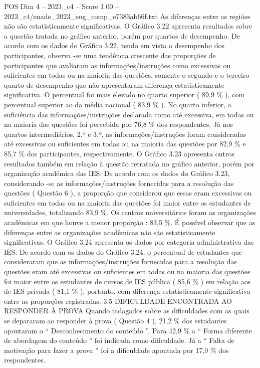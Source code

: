 \begin{textsample}{POS Dim 4 – 2023\_c4 – Score 1.00 – 2023\_c4/enade\_2023\_eng\_comp\_e7383ab66f.txt}
As diferenças entre as regiões não são estatisticamente significativas.
O Gráfico 3.22 apresenta resultados sobre a questão tratada no gráfico anterior, porém por quartos de desempenho.
De acordo com os dados do Gráfico 3.22, tendo em vista o desempenho dos participantes, observa -se uma tendência crescente das proporções de participantes que avaliaram as informações/instruções como excessivas ou suficientes em todas ou na maioria das questões, somente o segundo e o terceiro quarto de desempenho que não apresentaram diferença estatisticamente significativa.
O percentual foi mais elevado no quarto superior ( 89,9 \% ), com percentual superior ao da média nacional ( 83,9 \% ).
No quarto inferior, a suficiência das informações/instruções declarada como até excessiva, em todas ou na maioria das questões foi percebida por 76,8 \% dos respondentes.
Já nos quartos intermediários, 2.º e 3.º, as informações/instruções foram consideradas até excessivas ou suficientes em todas ou na maioria das questões por 82,9 \% e 85,7 \% dos participantes, respectivamente.
O Gráfico 3.23 apresenta outros resultados também em relação à questão retratada no gráfico anterior, porém por organização acadêmica das IES.
De acordo com os dados do Gráfico 3.23, considerando -se as informações/instruções fornecidas para a resolução das questões ( Questão 6 ), a proporção que considerou que essas eram excessivas ou suficientes em todas ou na maioria das questões foi maior entre os estudantes de universidades, totalizando 83,9 \%.
Os centros universitários foram as organizações acadêmicas em que houve a menor proporção : 83,5 \%.
É possível observar que as diferenças entre as organizações acadêmicas não são estatisticamente significativas.
O Gráfico 3.24 apresenta os dados por categoria administrativa das IES.
De acordo com os dados do Gráfico 3.24, o percentual de estudantes que consideraram que as informações/instruções fornecidas para a resolução das questões eram até excessivas ou suficientes em todas ou na maioria das questões foi maior entre os estudantes de cursos de IES pública ( 85,6 \% ) em relação aos de IES privada ( 81,1 \% ), portanto, com diferença estatisticamente significativa entre as proporções registradas. 3.5 DIFICULDADE ENCONTRADA AO RESPONDER À PROVA Quando indagados sobre as dificuldades com as quais se depararam ao responder à prova ( Questão 4 ), 21,2 \% dos estudantes apontaram o “ Desconhecimento do conteúdo ”.
Para 42,9 \% a “ Forma diferente de abordagem do conteúdo ” foi indicada como dificuldade.
Já a “ Falta de motivação para fazer a prova ” foi a dificuldade apontada por 17,0 \% dos respondentes.

\end{textsample}
